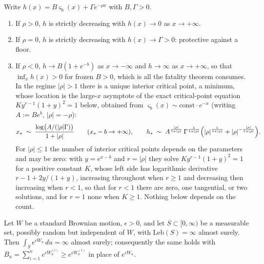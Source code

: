 \begin{proposition}[Trichotomy; {[P]}]\label{prop:trichotomy}
Write $h(x)=B\varsigma_b(x)+\Gamma e^{-\rho x}$ with $B,\Gamma>0$.
\begin{enumerate}[label=\emph{(\roman*)},itemsep=1pt]
\item If $\rho>0$, $h$ is strictly decreasing with $h(x)\to0$ as
$x\to+\infty$.
\item If $\rho=0$, $h$ is strictly decreasing with $h(x)\to\Gamma>0$:
protective against a floor.
\item If $\rho<0$, $h\to B(1+e^{-b})$ as $x\to-\infty$ and
$h\to\infty$ as $x\to+\infty$, so that $\inf_xh(x)>0$ for frozen
$B>0$, which is all the fatality theorem consumes. In the regime
$|\rho|>1$ there is a unique interior critical point, a minimum, whose location
is the large-$x$ asymptote of the exact critical-point equation
$Ky^{r-1}(1+y)^2=1$ below, obtained from $\varsigma_b(x)\sim
\mathrm{const}\cdot e^{-x}$ (writing $A:=Be^{b}$, $|\rho|=-\rho$):
\begin{equation}\label{eq:xstar}
x_\ast\;\sim\;\frac{\log\bigl(A/(|\rho|\Gamma)\bigr)}{1+|\rho|}
\qquad(x_\ast-b\to+\infty),
\qquad
h_\ast\;\sim\;A^{\frac{|\rho|}{1+|\rho|}}\,\Gamma^{\frac{1}{1+|\rho|}}
\Bigl(|\rho|^{\frac{1}{1+|\rho|}}+|\rho|^{-\frac{|\rho|}{1+|\rho|}}\Bigr).
\end{equation}
For $|\rho|\le1$ the number of interior critical points depends on the
parameters and may be zero: with $y=e^{x-b}$ and $r=|\rho|$ they solve
$Ky^{r-1}(1+y)^2=1$ for a positive constant $K$, whose left side has
logarithmic derivative $r-1+2y/(1+y)$, increasing throughout when
$r\ge1$ and decreasing then increasing when $r<1$, so that for $r<1$
there are zero, one tangential, or two solutions, and for $r=1$ none
when $K\ge1$. Nothing below depends on the count.
\end{enumerate}
\end{proposition}

\begin{lemma}
\label{lem:infbackground}
Let $W$ be a standard Brownian motion, $\epsilon>0$, and let
$S\subset[0,\infty)$ be a measurable set, possibly random but
independent of $W$, with $\mathrm{Leb}(S)=\infty$ almost surely. Then
$\int_S e^{\epsilon W_u}\,du=\infty$ almost surely; consequently the
same holds with $B_u=\sum_{i=1}^ne^{\epsilon W^{(i)}_u}\ge
e^{\epsilon W^{(1)}_u}$ in place of $e^{\epsilon W_u}$.
\end{lemma}


